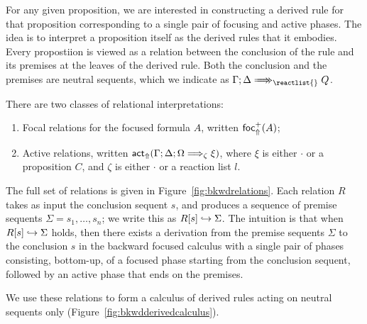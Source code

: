 For any given proposition, we are interested in constructing a derived rule for
that proposition corresponding to a single pair of focusing and active
phases. The idea is to interpret a proposition itself as the derived rules that
it embodies. Every propostiion is viewed as a relation between the conclusion of
the rule and its premises at the leaves of the derived rule. Both the conclusion
and the premises are neutral sequents, which we indicate as
$\zbneuseq{\Gamma}{\Delta}{\reactlist{}}{Q}$.

There are two classes of relational interpretations:

\begin{enumerate}
\item Focal relations for the focused formula $A$, written $\textsf{foc}^+_{\Uparrow}(A)$;
\item Active relations, written
  $\textsf{act}_{\Uparrow}(\Gamma; \Delta; \Omega \Longrightarrow_{\zeta} \xi)$, where $\xi$ is
  either $\cdot$ or a proposition $C$, and $\zeta$ is either $\cdot$ or a
  reaction list $l$.
\end{enumerate}

The full set of relations is given in Figure~\ref{fig:bkwdrelations}. Each
relation $R$ takes as input the conclusion sequent $s$, and produces a sequence
of premise sequents $\Sigma = s_1, \dots, s_n$; we write this as
$R [s] \hookrightarrow \Sigma$. The intuition is that when $R [s] \hookrightarrow \Sigma$ holds,
then there exists a derivation from the premise sequents $\Sigma$ to the
conclusion $s$ in the backward focused calculus with a single pair of phases
consisting, bottom-up, of a focused phase starting from the conclusion sequent,
followed by an active phase that ends on the premises.

We use these relations to form a calculus of derived
rules acting on neutral sequents only (Figure~\ref{fig:bkwdderivedcalculus}).

